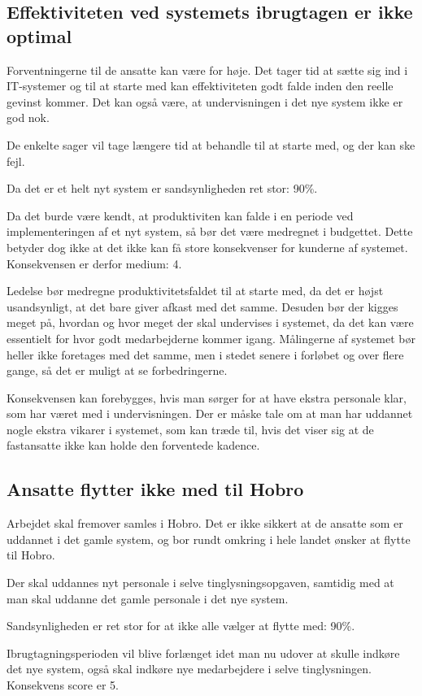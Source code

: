 \documentclass[10pt,a4paper,danish]{article}
\begin{document}
\subsection{Effektiviteten ved systemets ibrugtagen er ikke optimal}
Forventningerne til de ansatte kan være for høje. Det tager tid at sætte sig ind i IT-systemer og til at starte med kan effektiviteten godt falde inden den reelle gevinst kommer. Det kan også være, at undervisningen i det nye system ikke er god nok.

De enkelte sager vil tage længere tid at behandle til at starte med, og der kan ske fejl.

Da det er et helt nyt system er sandsynligheden ret stor: 90\%.

Da det burde være kendt, at produktiviten kan falde i en periode ved implementeringen af et nyt system, så bør det være medregnet i budgettet. Dette betyder dog ikke at det ikke kan få store konsekvenser for kunderne af systemet. Konsekvensen er derfor medium: 4.

Ledelse bør medregne produktivitetsfaldet til at starte med, da det er højst usandsynligt, at det bare giver afkast med det samme. Desuden bør der kigges meget på, hvordan og hvor meget der skal undervises i systemet, da det kan være essentielt for hvor godt medarbejderne kommer igang. Målingerne af systemet bør heller ikke foretages med det samme, men i stedet senere i forløbet og over flere gange, så det er muligt at se forbedringerne. 

Konsekvensen kan forebygges, hvis man sørger for at have ekstra personale klar, som har været med i undervisningen. Der er måske tale om at man har uddannet nogle ekstra vikarer i systemet, som kan træde til, hvis det viser sig at de fastansatte ikke kan holde den forventede kadence.


\subsection{Ansatte flytter ikke med til Hobro}
Arbejdet skal fremover samles i Hobro. Det er ikke sikkert at de ansatte som er uddannet i det gamle system, og bor rundt omkring i hele landet ønsker at flytte til Hobro.

Der skal uddannes nyt personale i selve tinglysningsopgaven, samtidig med at man skal uddanne det gamle personale i det nye system.

Sandsynligheden er ret stor for at ikke alle vælger at flytte med: 90\%.

Ibrugtagningsperioden vil blive forlænget idet man nu udover at skulle indkøre det nye system, også skal indkøre nye medarbejdere i selve tinglysningen. Konsekvens score er 5.
\end{document}
